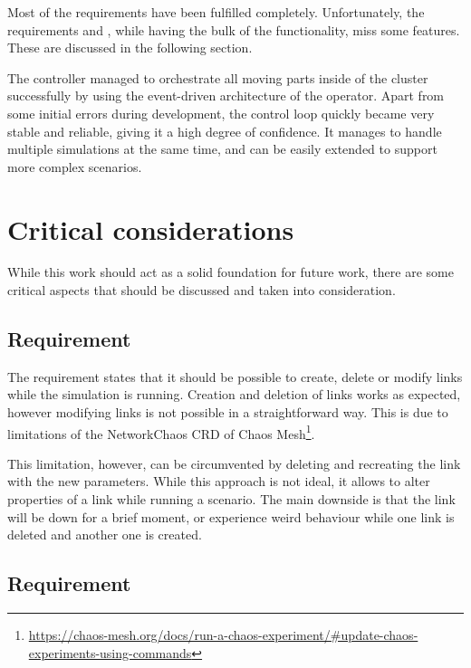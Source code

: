 Most of the requirements have been fulfilled completely. Unfortunately, the requirements  and , while having the bulk of the functionality, miss some features. These are discussed in the following section.

The controller managed to orchestrate all moving parts inside of the cluster successfully by using the event-driven architecture of the operator. Apart from some initial errors during development, the control loop quickly became very stable and reliable, giving it a high degree of confidence. It manages to handle multiple simulations at the same time, and can be easily extended to support more complex scenarios.

\section{Critical considerations}

While this work should act as a solid foundation for future work, there are some critical aspects that should be discussed and taken into consideration.

\subsection{Requirement }

The requirement  states that it should be possible to create, delete or modify links while the simulation is running. Creation and deletion of links works as expected, however modifying links is not possible in a straightforward way. This is due to limitations of the NetworkChaos CRD of Chaos Mesh\footnote{\url{https://chaos-mesh.org/docs/run-a-chaos-experiment/\#update-chaos-experiments-using-commands}}.

This limitation, however, can be circumvented by deleting and recreating the link with the new parameters. While this approach is not ideal, it allows to alter properties of a link while running a scenario. The main downside is that the link will be down for a brief moment, or experience weird behaviour while one link is deleted and another one is created.

\subsection{Requirement }

